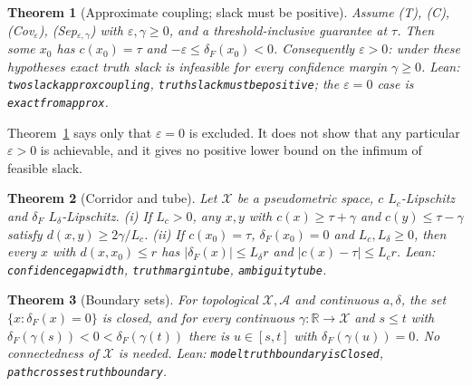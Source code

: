 \documentclass[10pt]{article}
\newtheorem{theorem}{Theorem}
\theoremstyle{definition}
\theoremstyle{remark}
\newcommand{\X}{\mathcal{X}}
\newcommand{\A}{\mathcal{A}}
\newcommand{\R}{\mathbb{R}}
\newcommand{\conf}{c}
\newcommand{\dF}{\delta_{\!F}}
\newcommand{\leanid}[1]{{\def\_{\textunderscore\allowbreak}\texttt{#1}}}
\begin{document}
\begin{theorem}[Approximate coupling; slack must be positive]
\label{thm:approx}
Assume (T), (C), (Cov$_\varepsilon$), (Sep$_{\varepsilon,\gamma}$) with
$\varepsilon,\gamma\ge0$, and a threshold-inclusive guarantee at $\tau$.
Then some $x_0$ has $\conf(x_0)=\tau$ and $-\varepsilon\le\dF(x_0)<0$.
Consequently $\varepsilon>0$: under these hypotheses exact truth slack
is infeasible for every confidence margin $\gamma\ge0$. Lean:
\leanid{two\_slack\_approx\_coupling},
\leanid{truth\_slack\_must\_be\_positive}; the $\varepsilon=0$ case is
\leanid{exact\_from\_approx}.
\end{theorem}

Theorem~\ref{thm:approx} says only that $\varepsilon=0$ is excluded. It
does not show that any particular $\varepsilon>0$ is achievable, and it
gives no positive lower bound on the infimum of feasible slack.

\begin{theorem}[Corridor and tube]
\label{thm:width}
Let $\X$ be a pseudometric space, $\conf$ $L_c$-Lipschitz and $\dF$
$L_\delta$-Lipschitz.
(i) If $L_c>0$, any $x,y$ with $\conf(x)\ge\tau+\gamma$ and
$\conf(y)\le\tau-\gamma$ satisfy $d(x,y)\ge 2\gamma/L_c$.
(ii) If $\conf(x_0)=\tau$, $\dF(x_0)=0$ and $L_c,L_\delta\ge0$, then every
$x$ with $d(x,x_0)\le r$ has $|\dF(x)|\le L_\delta r$ and
$|\conf(x)-\tau|\le L_c r$. Lean: \leanid{confidence\_gap\_width},
\leanid{truth\_margin\_tube}, \leanid{ambiguity\_tube}.
\end{theorem}

\begin{theorem}[Boundary sets]
\label{thm:closed}
For topological $\X,\A$ and continuous $a,\delta$, the set
$\{x:\dF(x)=0\}$ is closed, and for every continuous
$\gamma:\R\to\X$ and $s\le t$ with $\dF(\gamma(s))<0<\dF(\gamma(t))$ there
is $u\in[s,t]$ with $\dF(\gamma(u))=0$. No connectedness of $\X$ is
needed. Lean: \leanid{model\_truth\_boundary\_isClosed},
\leanid{path\_crosses\_truth\_boundary}.
\end{theorem}
\end{document}
